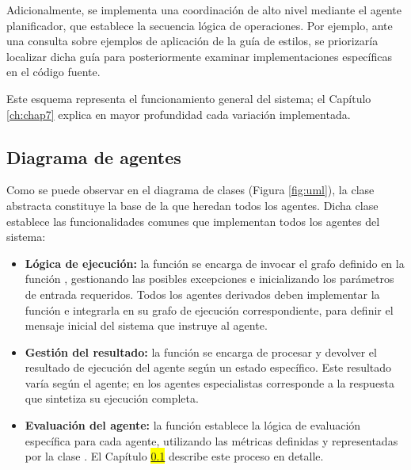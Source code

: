 Adicionalmente, se implementa una coordinación de alto nivel mediante el agente planificador, que establece la secuencia lógica de operaciones. Por ejemplo, ante una consulta sobre ejemplos de aplicación de la guía de estilos, se priorizaría localizar dicha guía para posteriormente examinar implementaciones específicas en el código fuente.

Este esquema representa el funcionamiento general del sistema; el Capítulo \ref{ch:chap7} explica en mayor profundidad cada variación implementada.

\subsection{Diagrama de agentes}

Como se puede observar en el diagrama de clases (Figura \ref{fig:uml}), la clase abstracta  constituye la base de la que heredan todos los agentes. Dicha clase establece las funcionalidades comunes que implementan todos los agentes del sistema:

\begin{itemize}
\item \textbf{Lógica de ejecución:} la función  se encarga de invocar el grafo definido en la función , gestionando las posibles excepciones e inicializando los parámetros de entrada requeridos. Todos los agentes derivados deben implementar la función  e integrarla en su grafo de ejecución correspondiente, para definir el mensaje inicial del sistema que instruye al agente.
\item \textbf{Gestión del resultado:} la función  se encarga de procesar y devolver el resultado de ejecución del agente según un estado específico. Este resultado varía según el agente; en los agentes especialistas corresponde a la respuesta que sintetiza su ejecución completa.
\item \textbf{Evaluación del agente:} la función  establece la lógica de evaluación específica para cada agente, utilizando las métricas definidas y representadas por la clase . El Capítulo \colorbox{yellow}{\ref{}} describe este proceso en detalle.
\end{itemize}

